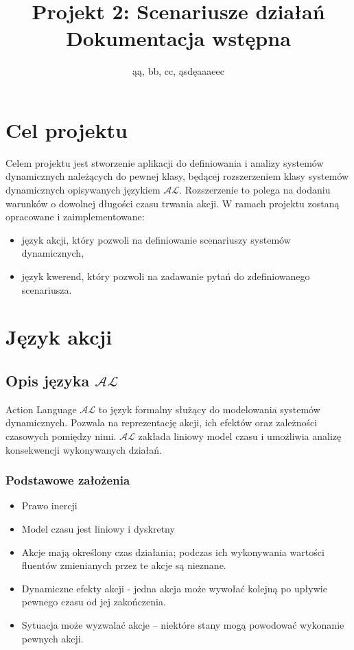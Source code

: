\documentclass{article}
\title{Projekt 2: Scenariusze działań \\ \large{Dokumentacja wstępna}}
\author{ąą, bb, cc, ąsdęaaaeec}
\begin{document}
\maketitle
\tableofcontents

\newpage

\section{Cel projektu}
Celem projektu jest stworzenie aplikacji do definiowania i analizy systemów dynamicznych należących do pewnej klasy, będącej rozszerzeniem klasy systemów dynamicznych opisywanych językiem $\mathcal{AL}$.
Rozszerzenie to polega na dodaniu warunków o dowolnej długości czasu trwania akcji. W ramach projektu zostaną opracowane i zaimplementowane:
\begin{itemize}
	\item język akcji, który pozwoli na definiowanie scenariuszy systemów dynamicznych,
	\item język kwerend, który pozwoli na zadawanie pytań do zdefiniowanego scenariusza.
\end{itemize}	


\section{Język akcji}

\subsection{Opis języka $\mathcal{AL}$}
Action Language $\mathcal{AL}$ to język formalny służący do modelowania systemów dynamicznych. Pozwala na reprezentację akcji, ich efektów oraz zależności czasowych pomiędzy nimi. $\mathcal{AL}$ zakłada liniowy model czasu i umożliwia analizę konsekwencji wykonywanych działań.

\subsubsection{Podstawowe założenia}
\begin{itemize}
    \item Prawo inercji
    \item Model czasu jest liniowy i dyskretny
    \item Akcje mają określony czas działania; podczas ich wykonywania wartości fluentów zmienianych przez te akcje są nieznane.
    \item Dynamiczne efekty akcji - jedna akcja może wywołać kolejną po upływie pewnego czasu od jej zakończenia.
    \item Sytuacja może wyzwalać akcje – niektóre stany mogą powodować wykonanie pewnych akcji.
\end{itemize}
\end{document}

